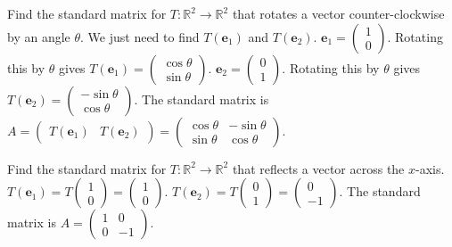 \begin{example}[Rotation]
Find the standard matrix for $T: \mathbb{R}^2 \to \mathbb{R}^2$ that rotates a vector counter-clockwise by an angle $\theta$.
We just need to find $T(\mathbf{e}_1)$ and $T(\mathbf{e}_2)$.
$\mathbf{e}_1 = \begin{pmatrix} 1 \\ 0 \end{pmatrix}$. Rotating this by $\theta$ gives $T(\mathbf{e}_1) = \begin{pmatrix} \cos\theta \\ \sin\theta \end{pmatrix}$.
$\mathbf{e}_2 = \begin{pmatrix} 0 \\ 1 \end{pmatrix}$. Rotating this by $\theta$ gives $T(\mathbf{e}_2) = \begin{pmatrix} -\sin\theta \\ \cos\theta \end{pmatrix}$.
The standard matrix is $A = \begin{pmatrix} T(\mathbf{e}_1) & T(\mathbf{e}_2) \end{pmatrix} = \begin{pmatrix} \cos\theta & -\sin\theta \\ \sin\theta & \cos\theta \end{pmatrix}$.
\end{example}

\begin{example}[Reflection]
Find the standard matrix for $T: \mathbb{R}^2 \to \mathbb{R}^2$ that reflects a vector across the $x$-axis.
$T(\mathbf{e}_1) = T\begin{pmatrix} 1 \\ 0 \end{pmatrix} = \begin{pmatrix} 1 \\ 0 \end{pmatrix}$.
$T(\mathbf{e}_2) = T\begin{pmatrix} 0 \\ 1 \end{pmatrix} = \begin{pmatrix} 0 \\ -1 \end{pmatrix}$.
The standard matrix is $A = \begin{pmatrix} 1 & 0 \\ 0 & -1 \end{pmatrix}$.
\end{example}

